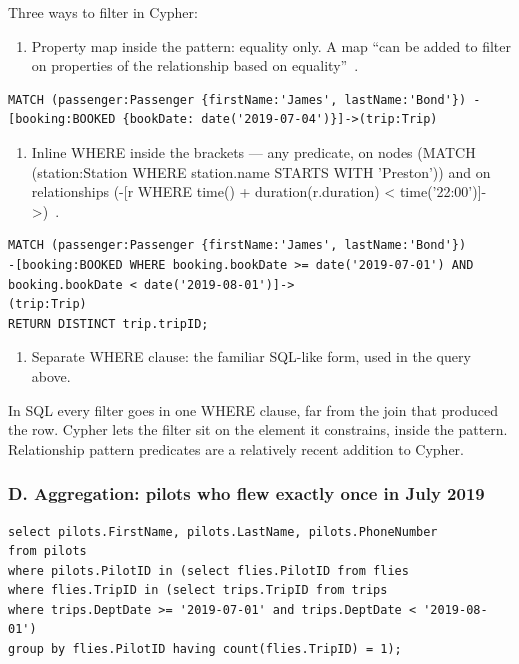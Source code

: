 \documentclass[10pt,a4paper,twocolumn]{article}
\begin{document}
Three ways to filter in Cypher:

\begin{enumerate}
  \item Property map inside the pattern: equality only. A map ``can be added to filter on properties of the relationship based on equality''~\cite{neo4j2026patterns}.
\end{enumerate}

\begin{lstlisting}[style=cyphercode,caption={Filtering with a property map inside the pattern},label={lst:q2map}]
MATCH (passenger:Passenger {firstName:'James', lastName:'Bond'}) - [booking:BOOKED {bookDate: date('2019-07-04')}]->(trip:Trip)
\end{lstlisting}

\begin{enumerate}[resume]
  \item Inline WHERE inside the brackets --- any predicate, on nodes (MATCH (station:Station WHERE station.name STARTS WITH 'Preston')) and on relationships (-[r WHERE time() + duration(r.duration) < time('22:00')]->)~\cite{neo4j2026patterns}.
\end{enumerate}

\begin{lstlisting}[style=cyphercode,caption={Filtering with an inline WHERE inside the relationship brackets},label={lst:q2inline}]
MATCH (passenger:Passenger {firstName:'James', lastName:'Bond'})
-[booking:BOOKED WHERE booking.bookDate >= date('2019-07-01') AND booking.bookDate < date('2019-08-01')]->
(trip:Trip)
RETURN DISTINCT trip.tripID;
\end{lstlisting}

\begin{enumerate}[resume]
  \item Separate WHERE clause: the familiar SQL-like form, used in the query above.
\end{enumerate}

In SQL every filter goes in one WHERE clause, far from the join that produced the row. Cypher lets the filter sit on the element it constrains, inside the pattern. Relationship pattern predicates are a relatively recent addition to Cypher.

\subsubsection*{D. Aggregation: pilots who flew exactly once in July 2019}

\begin{lstlisting}[style=sqlcode,caption={Pilots who flew exactly once in July 2019, in SQL},label={lst:q3sql}]
select pilots.FirstName, pilots.LastName, pilots.PhoneNumber
from pilots
where pilots.PilotID in (select flies.PilotID from flies
where flies.TripID in (select trips.TripID from trips
where trips.DeptDate >= '2019-07-01' and trips.DeptDate < '2019-08-01')
group by flies.PilotID having count(flies.TripID) = 1);
\end{lstlisting}
\end{document}
